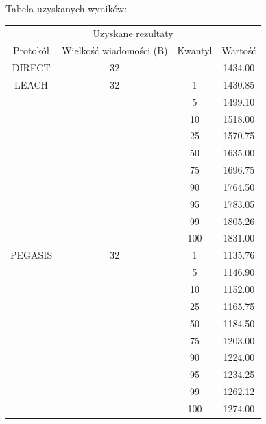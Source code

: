 \documentclass[a4paper,12pt,twoside,openany]{report}
\begin{document}
Tabela uzyskanych wyników:

\begin{longtable}{*{4}{c}}
\toprule
\multicolumn{4}{c}{Uzyskane rezultaty} \\
Protokół	& Wielkość wiadomości (B)	& Kwantyl	& Wartość \\
\midrule
\endhead
DIRECT	& 32 	& -	& 1434.00 \\*
\midrule
LEACH	& 32	& 1	& 1430.85 \\*
	&	& 5	& 1499.10 \\*
	&	& 10	& 1518.00 \\*
	&	& 25	& 1570.75 \\*
	&	& 50	& 1635.00 \\*
	&	& 75	& 1696.75 \\*
	&	& 90	& 1764.50 \\*
	&	& 95	& 1783.05 \\*
	&	& 99	& 1805.26 \\*
	&	& 100	& 1831.00 \\*
\midrule
PEGASIS	& 32	& 1	& 1135.76 \\*
	&	& 5	& 1146.90 \\*
	&	& 10	& 1152.00 \\*
	&	& 25	& 1165.75 \\*
	&	& 50	& 1184.50 \\*
	&	& 75	& 1203.00 \\*
	&	& 90	& 1224.00 \\*
	&	& 95	& 1234.25 \\*
	&	& 99	& 1262.12 \\*
	&	& 100	& 1274.00 \\*
\bottomrule
\end{longtable}
\end{document}
